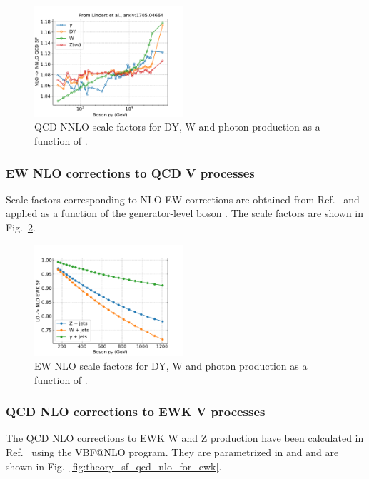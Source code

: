 \begin{figure}[ht!]
    \begin{center}
        \includegraphics[width=0.49\textwidth]{fig/theory/nnlo_qcd.pdf}
        \caption{
            QCD NNLO scale factors for DY, W and photon production as a function of \ptv.
          }
      \label{fig:theory_sf_qcd_nnlo}
    \end{center}
  \end{figure}

\subsubsection{EW NLO corrections to QCD V processes}
Scale factors corresponding to NLO EW corrections are obtained from Ref.~\cite{DMTheory} and applied as a function of the generator-level boson \pt. The scale factors are shown in Fig.~\ref{fig:theory_sf_ew_nlo}.

\begin{figure}[ht!]
    \begin{center}
        \includegraphics[width=0.49\textwidth]{fig/theory/nlo_ewk.pdf}
        \caption{
            EW NLO scale factors for DY, W and photon production as a function of \ptv.
          }
      \label{fig:theory_sf_ew_nlo}
    \end{center}
  \end{figure}

\subsubsection{QCD NLO corrections to EWK V processes}
The QCD NLO corrections to EWK W and Z production have been calculated in Ref.~\cite{AN-2017-267} using the VBF@NLO program. They are parametrized in \ptv and \mjj and are shown in Fig.~\ref{fig:theory_sf_qcd_nlo_for_ewk}.


